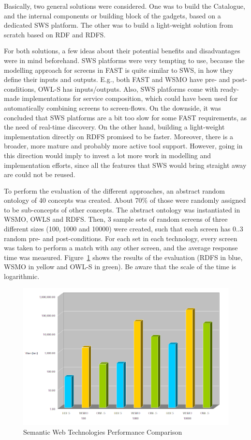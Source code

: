 \documentclass{fast_latex}
\begin{document}
Basically, two general solutions were considered. One was to build the Catalogue, and the internal components or building block of the gadgets, based on a dedicated SWS platform. The other was to build a light-weight solution from scratch based on RDF and RDFS.

For both solutions, a few ideas about their potential benefits and disadvantages were in mind beforehand. SWS platforms were very tempting to use, because the modelling approach for screens in FAST is quite similar to SWS, in how they define their inputs and outputs. E.g., both FAST and WSMO have pre- and post-conditions, OWL-S has inputs/outputs. Also, SWS platforms come with ready-made implementations for service composition, which could have been used for automatically combining screens to screen-flows. On the downside, it was concluded that SWS platforms are a bit too slow for some FAST requirements, as the need of real-time discovery. On the other hand, building a light-weight implementation directly on RDFS promised to be faster. Moreover, there is a broader, more mature and probably more active tool support. However, going in this direction would imply to invest a lot more work in modelling and implementation efforts, since all the features that SWS would bring straight away are could not be reused.

To perform the evaluation of the different approaches, an abstract random ontology of 40 concepts was created. About 70\% of those were randomly assigned to be sub-concepts of other concepts. The abstract ontology was instantiated in WSMO, OWLS and RDFS. Then, 3 sample sets of random screens of three different sizes (100, 1000 and 10000) were created, such that each screen has 0..3 random pre- and post-conditions. For each set in each technology, every screen was taken to perform a match with any other screen, and the average response time was measured. Figure~\ref{fig:comparison_chart} shows the results of the evaluation (RDFS in blue, WSMO in yellow and OWL-S in green). Be aware that the scale of the time is logarithmic.

\begin{figure}[htb]
\label{fig:comparison_chart}
\begin{center}
	\includegraphics[width=14cm]{images/comparison_chart}
	\caption{Semantic Web Technologies Performance Comparison}
\end{center}
\end{figure}
\end{document}

